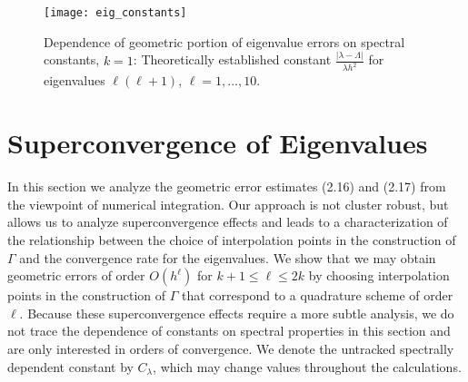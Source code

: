 \documentclass{siamart0516}
\numberwithin{equation}{section}
\numberwithin{theorem}{section}
\numberwithin{figure}{section}
\begin{document}
\setlength{\unitlength}{.75cm}
\begin{figure}[h]
\centering
\texttt{[image: eig\_constants]}
\caption{Dependence of geometric portion of eigenvalue errors on spectral constants, $k=1$:  Theoretically established constant $\frac{|\lambda-\Lambda|}{\lambda h^2}$ for eigenvalues $\ell(\ell+1)$, $\ell=1,..., 10$.}
\label{fig4}
\end{figure}





\section{Superconvergence of Eigenvalues} \label{sec6}
In this section we analyze the geometric error estimates (2.16) and (2.17) from the viewpoint of numerical integration. Our approach is not cluster robust, but allows us to analyze superconvergence effects and leads to a characterization of the relationship between the choice of interpolation points in the construction of $\Gamma$ and the convergence rate for the eigenvalues. We show that we may obtain geometric errors of order $O(h^\ell)$ for $k+1\leq \ell \leq 2k$ by choosing interpolation points in the construction of $\Gamma$ that correspond to a quadrature scheme of order $\ell$. Because these superconvergence effects require a more subtle analysis, we do not trace the dependence of constants on spectral properties in this section and are only interested in orders of convergence. We denote the untracked spectrally dependent constant by $C_\lambda$, which may change values throughout the calculations.
\end{document}
